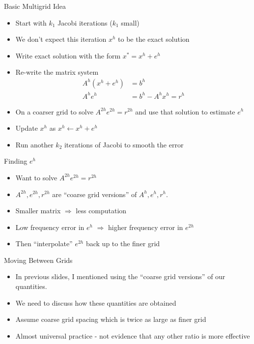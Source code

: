 \documentclass[11pt]{beamer}
\begin{document}
\begin{frame}{Basic Multigrid Idea}
  \begin{itemize}
  \item Start with $k_1$ Jacobi iterations ($k_1$ small)
  \item We don't expect this iteration $x^h$ to be the exact solution
  \item Write exact solution with the form $x^* = x^{h} + e^{h}$
  \item Re-write the matrix system
    \begin{align*}
      A^h(x^h + e^h) &= b^h \\
      A^he^h &= b^h - A^hx^h = r^h
    \end{align*}
  \item On a coarser grid to solve $A^{2h}e^{2h} = r^{2h}$ and use that solution
    to estimate $e^h$
  \item Update $x^{h}$ as $x^h \leftarrow x^h + e^h$
  \item Run another $k_2$ iterations of Jacobi to smooth the error
  \end{itemize}
\end{frame}
\begin{frame}{Finding $e^h$}
  \begin{itemize}
  \item Want to solve $A^{2h}e^{2h} = r^{2h}$
  \item $A^{2h}, e^{2h}, r^{2h}$ are ``coarse grid versions'' of $A^h, e^h, r^h$.
  \item Smaller matrix $\Rightarrow$ less computation
  \item Low frequency error in $e^h$ $\Rightarrow$ higher frequency error in $e^{2h}$
  \item Then ``interpolate'' $e^{2h}$ back up to the finer grid
  \end{itemize}
\end{frame}
\begin{frame}{Moving Between Grids}
  \begin{itemize}
  \item In previous slides, I mentioned using the ``coarse grid versions'' of our
    quantities.
  \item We need to discuss how these quantities are obtained
  \item Assume coarse grid spacing which is twice as large as finer grid
  \item Almost universal practice - not evidence that any other ratio is more effective
  \end{itemize}
\end{frame}
\end{document}
